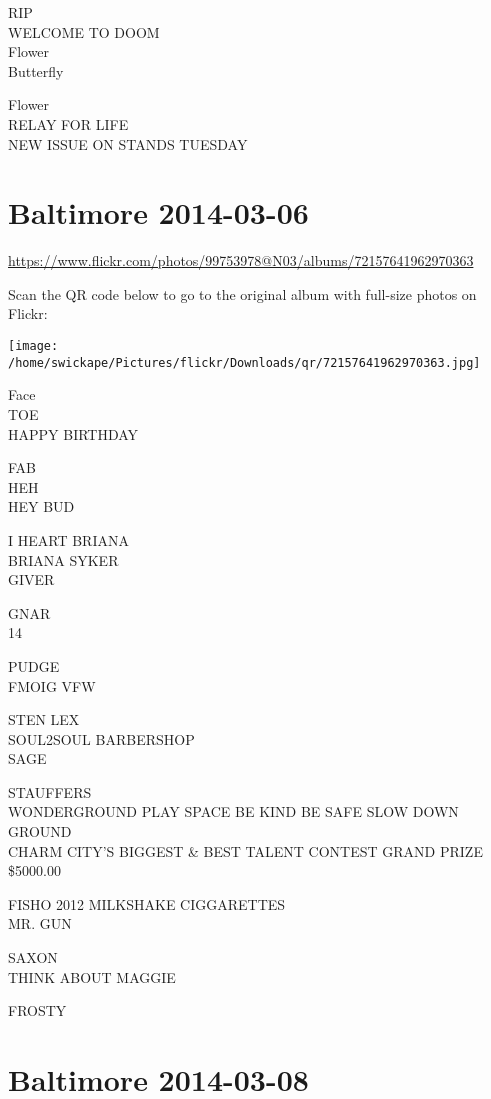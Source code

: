 \documentclass[10pt,letterpaper]{article}
\begin{document}
RIP\\
WELCOME TO DOOM\\
Flower\\
Butterfly

Flower\\
RELAY FOR LIFE\\
NEW ISSUE ON STANDS TUESDAY
\pagebreak

\section*{Baltimore 2014-03-06}

\url{https://www.flickr.com/photos/99753978@N03/albums/72157641962970363}

Scan the QR code below to go to the original album with full-size photos on Flickr:

\texttt{[image: /home/swickape/Pictures/flickr/Downloads/qr/72157641962970363.jpg]}
\pagebreak

Face\\
TOE\\
HAPPY BIRTHDAY

FAB\\
HEH\\
HEY BUD

I HEART BRIANA\\
BRIANA SYKER\\
GIVER

GNAR\\
14

PUDGE\\
FMOIG VFW

STEN LEX\\
SOUL2SOUL BARBERSHOP\\
SAGE

STAUFFERS\\
WONDERGROUND PLAY SPACE BE KIND BE SAFE SLOW DOWN\\
GROUND\\
CHARM CITY'S BIGGEST \& BEST TALENT CONTEST GRAND PRIZE \$5000.00

FISHO 2012 MILKSHAKE CIGGARETTES\\
MR. GUN

SAXON\\
THINK ABOUT MAGGIE

FROSTY
\pagebreak

\section*{Baltimore 2014-03-08}
\end{document}
